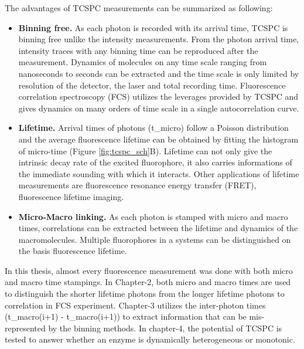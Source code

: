 The advantages of TCSPC measurements can be summarized as following:
\begin{itemize}
	\item \textbf{Binning free.} As each photon is recorded with its arrival time, TCSPC is binning free unlike the intensity measurements.
	From the photon arrival time, intensity traces with any binning time can be reproduced after the measurement.
	Dynamics of molecules on any time scale ranging from nanoseconds to seconds can be extracted and the time scale is only limited by resolution of the detector, the laser and total recording time.
	Fluorescence correlation spectroscopy (FCS) utilizes the leverages provided by TCSPC and gives dynamics on many orders of time scale in a single autocorrelation curve.
	\item \textbf{Lifetime.} Arrival times of photons (t\_micro) follow a Poisson distribution and the average fluorescence lifetime can be obtained by fitting the histogram of micro-time (Figure \ref{fig:tcspc_sch}B).
	Lifetime can not only give the intrinsic decay rate of the excited fluorophore, it also carries informations of the immediate sounding with which it interacts.
	Other applications of lifetime measurements are fluorescence resonance energy transfer (FRET), fluorescence lifetime imaging.\cite{selvin2000the,lakowicz1992fluorescence} 
	\item \textbf{Micro-Macro linking.} As each photon is stamped with micro and macro times, correlations can be extracted between the lifetime and dynamics of the macromolecules.
	Multiple fluorophores in a systems can be distinguished on the basis fluorescence lifetime.
\end{itemize}
In this thesis, almost every fluorescence measurement was  done with both micro and macro time stampings.
In Chapter-2, both micro and macro times are used to distinguish the shorter lifetime photons from the longer lifetime photons to correlation in FCS experiment.
Chapter-3 utilizes the inter-photon times (t\_macro(i+1) - t\_macro(i+1)) to extract information that can be mis-represented by the binning methods.
In chapter-4, the potential of TCSPC is tested to answer whether an enzyme is dynamically heterogeneous or monotonic. 
%
